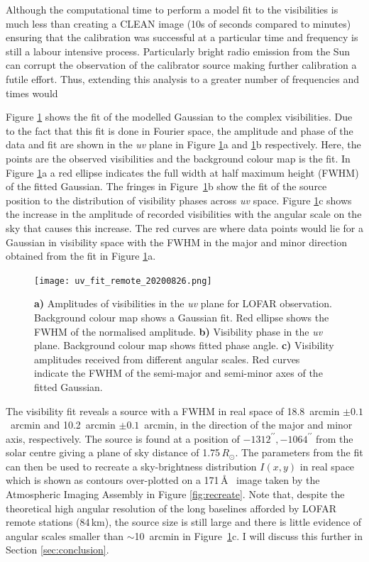 Although the computational time to perform a model fit to the visibilities is much less than creating a CLEAN image (10s of seconds compared to minutes) ensuring that the calibration was successful at a particular time and frequency is still a labour intensive process. Particularly bright radio emission from the Sun can corrupt the observation of the calibrator source making further calibration a futile effort. Thus, extending this analysis to a greater number of frequencies and times would 

Figure \ref{fig:uv_fit} shows the fit of the modelled Gaussian to the complex visibilities. Due to the fact that this fit is done in Fourier space, the amplitude and phase of the data and fit are shown in the \textit{uv} plane in Figure \ref{fig:uv_fit}a and \ref{fig:uv_fit}b respectively. Here, the points are the observed visibilities and the background colour map is the fit. In Figure \ref{fig:uv_fit}a a red ellipse indicates the full width at half maximum height (FWHM) of the fitted Gaussian. The fringes in Figure~\ref{fig:uv_fit}b show the fit of the source position to the distribution of visibility phases across \textit{uv} space.
Figure \ref{fig:uv_fit}c shows the increase in the amplitude of recorded visibilities with the angular scale on the sky that causes this increase. The red curves are where data points would lie for a Gaussian in visibility space with the FWHM in the major and minor direction obtained from the fit in Figure \ref{fig:uv_fit}a.

\begin{figure}
    \centering
    \texttt{[image: uv\_fit\_remote\_20200826.png]}
    \caption[Results of directly fitting LOFAR visibilities.]{\textbf{a)} Amplitudes of visibilities in the \textit{uv} plane for LOFAR observation. Background colour map shows a Gaussian fit. Red ellipse shows the FWHM of the normalised amplitude. \textbf{b)} Visibility phase in the \textit{uv} plane. Background colour map shows fitted phase angle. \textbf{c)} Visibility amplitudes received from different angular scales. Red curves indicate the FWHM of the semi-major and semi-minor axes of the fitted Gaussian.}
    \label{fig:uv_fit}
\end{figure}

The visibility fit reveals a source with a FWHM in real space of 18.8~arcmin $\pm 0.1$~arcmin and 10.2~arcmin $\pm 0.1$~arcmin, in the direction of the major and minor axis, respectively. The source is found at a position of $-1312^{\prime\prime}, -1064^{\prime\prime}$ from the solar centre giving a plane of sky distance of 1.75$\, R_\odot$. The parameters from the fit can then be used to recreate a sky-brightness distribution $I(x,y)$ in real space which is shown as contours over-plotted on a 171\,\AA~ image taken by the Atmospheric Imaging Assembly \citep[AIA;][]{Lemen2012} in Figure \ref{fig:recreate}. Note that, despite the theoretical high angular resolution of the long baselines afforded by LOFAR remote stations (84\,km), the source size is still large and there is little evidence of angular scales smaller than $\sim$10~arcmin in Figure~\ref{fig:uv_fit}c. I will discuss this further in Section \ref{sec:conclusion}.

